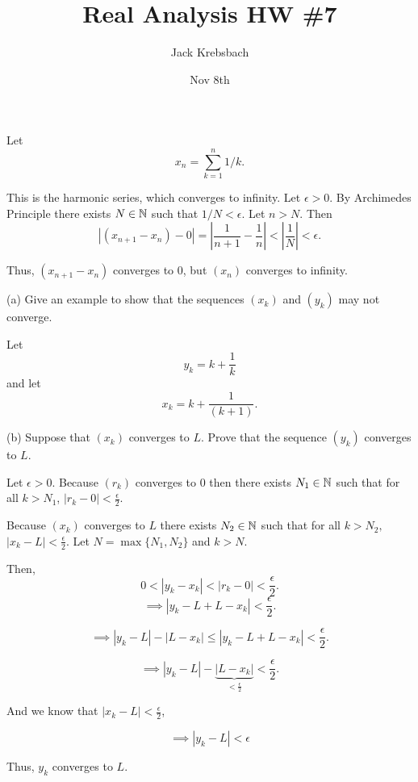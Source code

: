 \documentclass{report}
\title{Real Analysis HW \#7}
\author{Jack Krebsbach }
\date{Nov 8th}
\begin{document}
\maketitle
{}

\sol
Let $$x_n= \sum_{k=1}^{n} 1/k.$$

This is the harmonic series, which converges to infinity. Let $\epsilon>0.$ By Archimedes Principle there exists $N \in \NN$ such that $1/N < \epsilon.$ Let $n>N.$ Then $$|(x_{n+1} - x_n) -0 | = \left|\frac{1}{n+1} - \frac{1}{n}\right| < \left|\frac{1}{N} \right| < \epsilon.$$

Thus, $\left(x_{n+1}-x_n\right)$ converges to 0, but $(x_n)$ converges to infinity.

\bigskip
{}

\bigskip
(a) Give an example to show that the sequences $\left(x_k\right)$ and $\left(y_k\right)$ may not converge.
\bigskip

\sol
Let $$y_k = k + \frac{1}{k}$$ and let $$x_k = k +\frac{1}{(k+1)}.$$

\bigskip
\bigskip
\bigskip
(b) Suppose that $\left(x_k\right)$ converges to $L$. Prove that the sequence $\left(y_k\right)$ converges to $L$.

\begin{myproof}
    Let $\epsilon >0.$ Because $(r_k)$ converges to $0$ then there exists $N_1 \in \NN$ such that for all $k>N_1$, $\left|r_k - 0 \right| < \frac{\epsilon}{2}.$

    Because $(x_k)$ converges to $L$ there exists $N_2 \in \NN$ such that for all $k>N_2,$ $\left| x_k -L\right| < \frac{\epsilon}{2}.$ Let $N = \max\{N_1,N_2\}$ and $k> N.$

    Then, $$0 < \left| y_k - x_k \right| < \left|r_k -0\right| < \frac{\epsilon}{2}.$$
$$\implies \left| y_k - L + L - x_k \right| < \frac{\epsilon}{2}.$$

$$\implies \left| y_k - L\right|  - \left|L - x_k \right| \leq \left| y_k - L + L - x_k \right|< \frac{\epsilon}{2}.$$

$$\implies \left| y_k - L\right|  - \underbrace{\left|L - x_k \right|}_{< \frac{\epsilon}{2}} < \frac{\epsilon}{2}.$$

And we know that $\left| x_k -L\right| < \frac{\epsilon}{2}$,

$$\implies \left| y_k - L\right| < \epsilon$$

Thus, $y_k$ converges to $L.$
\end{myproof}
\end{document}
